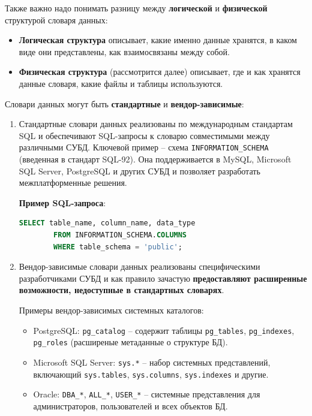 Также важно надо понимать разницу между \textbf{логической} и \textbf{физической} структурой словаря данных:

\begin{itemize}
    \item \textbf{Логическая структура} описывает, какие именно данные хранятся, в каком виде они представлены, как взаимосвязаны между собой.
    \item \textbf{Физическая структура} (рассмотрится далее) описывает, где и как хранятся данные словаря, какие файлы и таблицы используются.
\end{itemize}

Словари данных могут быть \textbf{стандартные} и \textbf{вендор-зависимые}:

\begin{enumerate}
 
    \item Стандартные словари данных реализованы по международным стандартам SQL и обеспечивают SQL-запросы к словарю совместимыми между различными СУБД. Ключевой пример – схема \texttt{INFORMATION\_SCHEMA} (введенная в стандарт SQL-92). Она поддерживается в MySQL, Microsoft SQL Server, PostgreSQL и других СУБД и позволяет разработать межплатформенные решения.

        \textbf{Пример SQL-запроса}:
        \begin{lstlisting}[language=SQL]
        SELECT table_name, column_name, data_type 
        FROM INFORMATION_SCHEMA.COLUMNS 
        WHERE table_schema = 'public';
        \end{lstlisting}

    \item Вендор-зависимые словари данных реализованы специфическими разработчиками СУБД и как правило зачастую \textbf{предоставляют расширенные возможности, недоступные в стандартных словарях}. 

    Примеры вендор-зависимых системных каталогов:
    \begin{itemize}
        \item PostgreSQL: \texttt{pg\_catalog} – содержит таблицы \texttt{pg\_tables}, \texttt{pg\_indexes}, \texttt{pg\_roles} (расширеные метаданные о структуре БД).
        \item Microsoft SQL Server: \texttt{sys.*} – набор системных представлений, включающий \texttt{sys.tables}, \texttt{sys.columns}, \texttt{sys.indexes} и другие.
        \item Oracle: \texttt{DBA\_*}, \texttt{ALL\_*}, \texttt{USER\_*} – системные представления для администраторов, пользователей и всех объектов БД.
    \end{itemize}

\end{enumerate}

